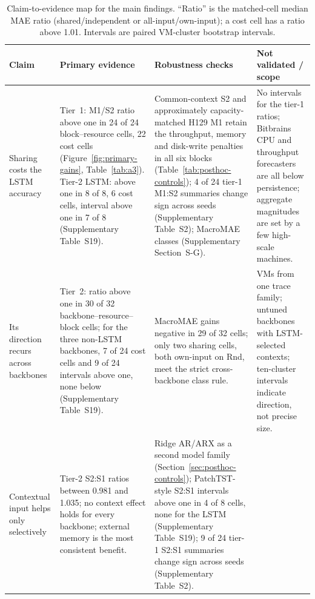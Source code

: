 \begin{table}[t]\footnotesize
\centering
\caption{Claim-to-evidence map for the main findings. ``Ratio'' is the matched-cell median MAE ratio (shared/independent or
all-input/own-input); a cost cell has a ratio above 1.01. Intervals are paired VM-cluster bootstrap intervals.}
\label{tab:claim-evidence}
\setlength{\tabcolsep}{3pt}
\renewcommand{\arraystretch}{1.15}
\begin{tabular}{@{}>{\raggedright\arraybackslash}p{}
  >{\raggedright\arraybackslash}p{}
  >{\raggedright\arraybackslash}p{}
  >{\raggedright\arraybackslash}p{}@{}}
\toprule
Claim & Primary evidence & Robustness checks & Not validated / scope \\
\midrule
Sharing costs the LSTM accuracy
  & Tier~1: M1/S2 ratio above one in 24 of 24 block--resource cells, 22 cost cells (Figure~\ref{fig:primary-gains}, Table~\ref{tab:a3}).
    Tier-2 LSTM: above one in 8 of 8, 6 cost cells, interval above one in 7 of 8 (Supplementary Table~S19).
  & Common-context S2 and approximately capacity-matched H129 M1 retain the throughput, memory and disk-write penalties in all
    six blocks (Table~\ref{tab:posthoc-controls}); 4 of 24 tier-1 M1:S2 summaries change sign across seeds (Supplementary Table~S2); MacroMAE
    classes (Supplementary Section~S-G).
  & No intervals for the tier-1 ratios; Bitbrains CPU and throughput forecasters are all below persistence;
    aggregate magnitudes are set by a few high-scale machines. \\
\addlinespace
Its direction recurs across backbones
  & Tier~2: ratio above one in 30 of 32 backbone--resource--block cells; for the three non-LSTM backbones,
    7 of 24 cost cells and 9 of 24 intervals above one, none below (Supplementary Table~S19).
  & MacroMAE gains negative in 29 of 32 cells; only two sharing cells, both own-input on Rnd, meet the strict cross-backbone class rule.
  & 20 VMs from one trace family; untuned backbones with LSTM-selected contexts; ten-cluster intervals indicate
    direction, not precise size. \\
\addlinespace
Contextual input helps only selectively
  & Tier-2 S2:S1 ratios between 0.981 and 1.035; no context effect holds for every backbone; external memory is
    the most consistent benefit.
  & Ridge AR/ARX as a second model family (Section~\ref{sec:posthoc-controls}); PatchTST-style S2:S1 intervals above one in 4 of 8
    cells, none for the LSTM (Supplementary Table~S19); 9 of 24 tier-1 S2:S1 summaries change sign across seeds (Supplementary Table~S2).

\end{tabular}
\end{table}

